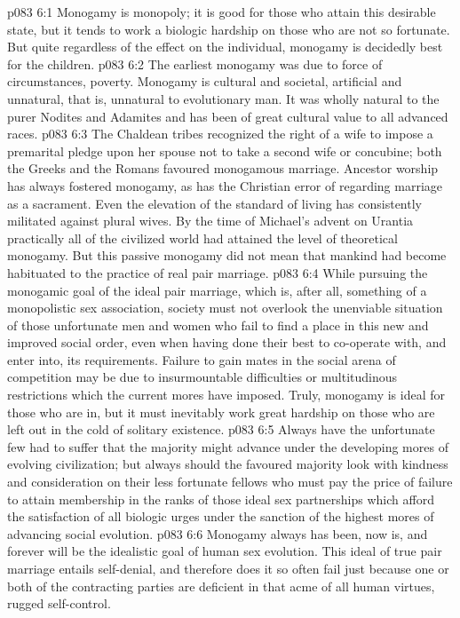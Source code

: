 \vs p083 6:1 Monogamy is monopoly; it is good for those who attain this desirable state, but it tends to work a biologic hardship on those who are not so fortunate. But quite regardless of the effect on the individual, monogamy is decidedly best for the children.
\vs p083 6:2 The earliest monogamy was due to force of circumstances, poverty. Monogamy is cultural and societal, artificial and unnatural, that is, unnatural to evolutionary man. It was wholly natural to the purer Nodites and Adamites and has been of great cultural value to all advanced races.
\vs p083 6:3 The Chaldean tribes recognized the right of a wife to impose a premarital pledge upon her spouse not to take a second wife or concubine; both the Greeks and the Romans favoured monogamous marriage. Ancestor worship has always fostered monogamy, as has the Christian error of regarding marriage as a sacrament. Even the elevation of the standard of living has consistently militated against plural wives. By the time of Michael’s advent on Urantia practically all of the civilized world had attained the level of theoretical monogamy. But this passive monogamy did not mean that mankind had become habituated to the practice of real pair marriage.
\vs p083 6:4 \pc While pursuing the monogamic goal of the ideal pair marriage, which is, after all, something of a monopolistic sex association, society must not overlook the unenviable situation of those unfortunate men and women who fail to find a place in this new and improved social order, even when having done their best to co\hyp{}operate with, and enter into, its requirements. Failure to gain mates in the social arena of competition may be due to insurmountable difficulties or multitudinous restrictions which the current mores have imposed. Truly, monogamy is ideal for those who are in, but it must inevitably work great hardship on those who are left out in the cold of solitary existence.
\vs p083 6:5 Always have the unfortunate few had to suffer that the majority might advance under the developing mores of evolving civilization; but always should the favoured majority look with kindness and consideration on their less fortunate fellows who must pay the price of failure to attain membership in the ranks of those ideal sex partnerships which afford the satisfaction of all biologic urges under the sanction of the highest mores of advancing social evolution.
\vs p083 6:6 \pc Monogamy always has been, now is, and forever will be the idealistic goal of human sex evolution. This ideal of true pair marriage entails self\hyp{}denial, and therefore does it so often fail just because one or both of the contracting parties are deficient in that acme of all human virtues, rugged self\hyp{}control.
